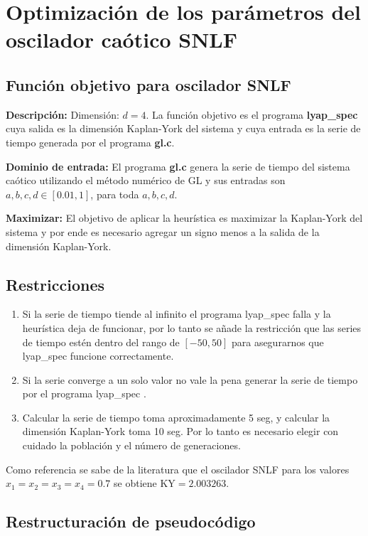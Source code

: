 \documentclass[10pt,a4paper]{article}
\begin{document}
\section{Optimización de los parámetros del oscilador caótico SNLF}

\subsection{Función objetivo para oscilador SNLF}

\textbf{Descripción:} 
	Dimensión: $d = 4$.	La función objetivo es el programa \textbf{lyap\_{}spec} cuya salida es la dimensión Kaplan-York del sistema y cuya entrada es la serie de tiempo generada por el programa \textbf{gl.c}.
	
	\textbf{Dominio de entrada:} El programa \textbf{gl.c} genera la serie de tiempo del sistema caótico utilizando el método numérico de GL y sus entradas son  $a, b, c, d \in [0.01, 1]$, para toda $a,b,c,d$.
	
	\textbf{Maximizar:} El objetivo de aplicar la heurística es maximizar la Kaplan-York del sistema y por ende es necesario agregar un signo menos a la salida de la dimensión Kaplan-York.
	
\subsection{Restricciones}
\begin{enumerate}
	\item Si la serie de tiempo tiende al infinito el programa lyap\_{}spec falla y la heurística deja de funcionar, por lo tanto se añade la restricción que las series de tiempo estén dentro del rango de $[-50,50]$ para asegurarnos que lyap\_{}spec funcione correctamente.
	\item Si la serie converge a un solo valor no vale la pena generar la serie de tiempo por el programa lyap\_{}spec .
	\item Calcular la serie de tiempo toma aproximadamente 5 seg, y calcular la dimensión Kaplan-York toma 10 seg. Por lo tanto es necesario elegir con cuidado la población y el número de generaciones.
\end{enumerate}

Como referencia se sabe de la literatura que el oscilador SNLF para los valores $x_{1} = x_{2} = x_{3} = x_{4} = 0.7$ se obtiene KY$=2.003263$.

\subsection{Restructuración de pseudocódigo}
\end{document}
